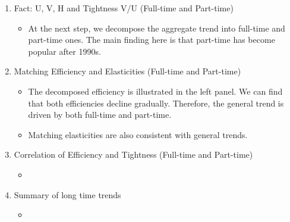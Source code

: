 \documentclass[12pt]{article}
\begin{document}
\begin{enumerate}
    \item Fact: U, V, H and Tightness V/U (Full-time and Part-time)
    \begin{itemize}
        \item At the next step, we decompose the aggregate trend into full-time and part-time ones. The main finding here is that part-time has become popular after 1990s.
    \end{itemize}
    \item Matching Efficiency and Elasticities (Full-time and Part-time)
    \begin{itemize}
        \item The decomposed efficiency is illustrated in the left panel. We can find that both efficiencies decline gradually. Therefore, the general trend is driven by both full-time and part-time.
        \item Matching elasticities are also consistent with general trends.
    \end{itemize}
    \item Correlation of Efficiency and Tightness (Full-time and Part-time)
    \begin{itemize}
        \item 
    \end{itemize}
    \item Summary of long time trends
    \begin{itemize}
        \item 
    \end{itemize}

\end{enumerate}
\end{document}
